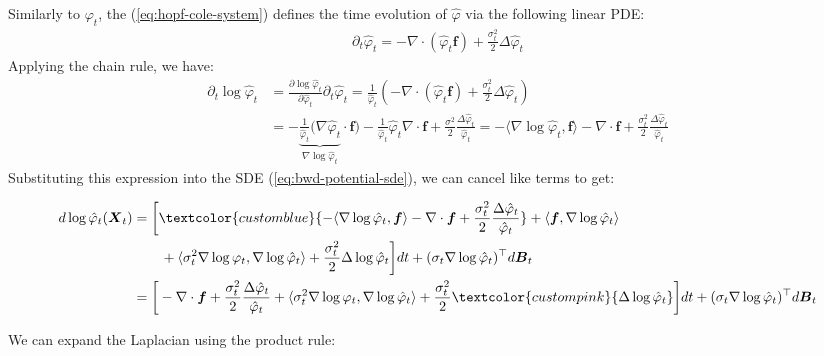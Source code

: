 \documentclass{article}
\newcommand{\bluetext}[1]{\textcolor{customblue}{#1}}
\newcommand{\pinktext}[1]{\textcolor{custompink}{#1}}
\begin{document}
Similarly to $\varphi_t$, the (\ref{eq:hopf-cole-system}) defines the time evolution of $\hat{\varphi}$ via the following linear PDE:
\begin{align}
    \partial_t \hat{\varphi}_t=-\nabla \cdot (\hat{\varphi}_t\boldsymbol{f})+\frac{\sigma_t^2}{2}\Delta \hat{\varphi}_t
\end{align}
Applying the chain rule, we have:
\begin{align}
    \partial_t \log \hat{\varphi}_t&=\frac{\partial \log \hat{\varphi}_t}{\partial \hat{\varphi}_t}\partial_t \hat{\varphi}_t=\frac{1}{\hat{\varphi}_t}\left(-\nabla \cdot (\hat{\varphi}_t\boldsymbol{f})+\frac{\sigma_t^2}{2}\Delta \hat{\varphi}_t\right)\nonumber\\
    &=-\underbrace{\frac{1}{\hat{\varphi}_t}(\nabla \hat{\varphi}_t}_{\nabla \log\hat{\varphi}_t}\cdot \boldsymbol{f})-\frac{1}{\hat{\varphi}_t}\hat{\varphi}_t\nabla\cdot \boldsymbol{f}+\frac{\sigma^2}{2}\frac{\Delta \hat{\varphi}_t}{\hat\varphi_t}=-\langle \nabla \log\hat{\varphi}_t, \boldsymbol{f}\rangle-\nabla\cdot \boldsymbol{f}+\frac{\sigma_t^2}{2}\frac{\Delta \hat{\varphi}_t}{\hat\varphi_t}
\end{align}
Substituting this expression into the SDE (\ref{eq:bwd-potential-sde}), we can cancel like terms to get:
\begin{small}
\begin{align}
    d\log \hat{\varphi}_t(\boldsymbol{X}_t)&=\bigg[\bluetext{-\langle \nabla\log\hat{\varphi}_t, \boldsymbol{f}\rangle-\nabla\cdot \boldsymbol{f}+\frac{\sigma_t^2}{2}\frac{\Delta \hat{\varphi}_t}{\hat\varphi_t}}+\langle \boldsymbol{f}, \nabla \log \hat{\varphi}_t\rangle \nonumber\\
    &\quad \quad + \langle \sigma_t^2 \nabla \log \varphi_t, \nabla \log \hat\varphi_t\rangle +\frac{\sigma_t^2}{2}\Delta \log\hat{\varphi}_t\bigg]dt+(\sigma_t\nabla \log\hat{\varphi}_t)^\top d \boldsymbol{B}_t\nonumber\\
    &=\bigg[-\nabla\cdot \boldsymbol{f}+\frac{\sigma_t^2}{2}\frac{\Delta \hat{\varphi}_t}{\hat\varphi_t}+ \langle \sigma_t^2 \nabla \log \varphi_t, \nabla \log \hat\varphi_t\rangle +\frac{\sigma_t^2}{2}\pinktext{\Delta \log \hat\varphi_t}\bigg]dt+(\sigma_t\nabla\log\hat{\varphi}_t)^\top d \boldsymbol{B}_t\label{eq:bwd-sde-intermediate}
\end{align}
\end{small}
We can expand the Laplacian using the product rule:
\end{document}
